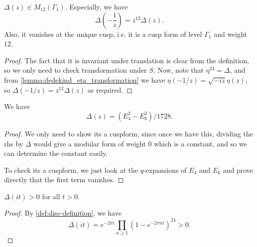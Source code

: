 \begin{lemma}\label{lemma:disc-cuspform}\leanok{}
$\Delta(z) \in M_{12}(\Gamma_1)$.
Especially, we have
\begin{equation}\label{eqn:disc-trans-S}
    \Delta\left(-\frac{1}{z}\right) = z^{12} \Delta(z).
\end{equation}
Also, it vanishes at the unique cusp, i.e. it is a cusp form of level $\Gamma_1$ and weight $12$.
\end{lemma}
\begin{proof}
    \leanok
    The fact that it is invariant under translation is clear from the definition, so we only need to check transformation under $S$. Now, note that $\eta^{24} = \Delta$, and from \ref{lemma:dedekind_eta_transformation} we have $\eta(-1/z) = \sqrt{-iz} \eta(z)$, so $\Delta(-1/z) = z^{12} \Delta(z)$ as required.
\end{proof}



\begin{lemma}\label{lemma:disc-E4E6}\leanok
We have
\begin{equation}
\Delta(z) = (E_4^3-E_6^2)/1728.
\end{equation}
\end{lemma}
\begin{proof}\leanok
    We only need to show its a cuspform, since once we have this, dividing the rhs by $\Delta$ would give a modular form of weight $0$ which is a constant, and so we can determine the constant easily.

    To check its a cuspform, we just look at  the $q$-expansions of $E_4$ and $E_6$ and prove directly that the first term vanishes.
\end{proof}


\begin{corollary}\label{cor:disc-pos}\leanok
$\Delta(it) > 0$ for all $t > 0$.
\end{corollary}
\begin{proof}\leanok
By \ref{def:disc-definition}, we have
$$
\Delta(it) = e^{-2 \pi t} \prod_{n \ge 1} (1 - e^{-2 \pi n t})^{24} > 0.
$$
\end{proof}

